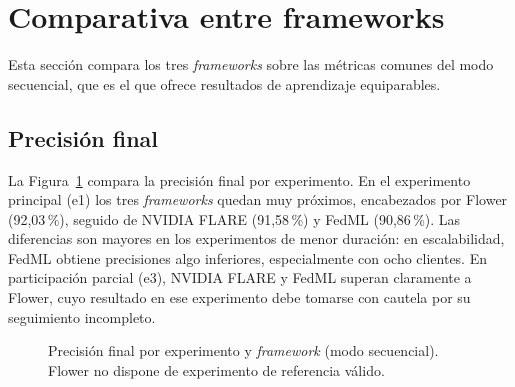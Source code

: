 \section{Comparativa entre frameworks}\label{sec:comparativa-frameworks}

Esta sección compara los tres \textit{frameworks} sobre las métricas comunes del modo secuencial,
que es el que ofrece resultados de aprendizaje equiparables.

\subsection{Precisión final}\label{sec:comp-precision}

La Figura~\ref{fig:comp-acc} compara la precisión final por experimento. En el experimento
principal (e1) los tres \textit{frameworks} quedan muy próximos, encabezados por Flower
(92{,}03\,\%), seguido de NVIDIA FLARE (91{,}58\,\%) y FedML (90{,}86\,\%). Las diferencias son
mayores en los experimentos de menor duración: en escalabilidad, FedML obtiene precisiones algo
inferiores, especialmente con ocho clientes. En participación parcial (e3), NVIDIA FLARE y FedML
superan claramente a Flower, cuyo resultado en ese experimento debe tomarse con cautela por su
seguimiento incompleto.

\begin{figure}[htbp]
  \centering
  \caption{Precisión final por experimento y \textit{framework} (modo secuencial). Flower no
  dispone de experimento de referencia válido.}
  \label{fig:comp-acc}
\end{figure}

